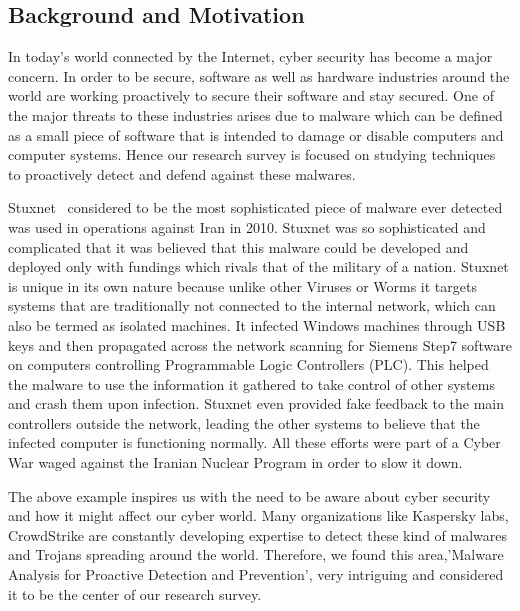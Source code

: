 \documentclass[11pt]{article}
\begin{document}
	\subsection{Background and Motivation}
	In today’s world connected by the Internet, cyber security has become a major concern. In order
to be secure, software as well as hardware industries around the world are working proactively to
secure their software and stay secured. One of the major threats to these industries arises due to
malware which can be defined as a small piece of software that is intended to damage or disable
computers and computer systems. Hence our research survey is focused on studying techniques
to proactively detect and defend against these malwares.

Stuxnet~\cite{creators2013kill, stuxnet} considered to be the most sophisticated piece of malware ever detected was used in operations against Iran in 2010. Stuxnet was so sophisticated and complicated that it was believed that this malware could be developed and deployed only with fundings which rivals that of the military of a nation. Stuxnet is unique in its own nature because unlike other Viruses or Worms it targets systems that are traditionally not connected to the internal network, which can also be termed as isolated machines. It infected Windows machines through USB keys and then propagated across the network scanning for Siemens Step7 software on computers controlling Programmable Logic Controllers (PLC). This helped the malware to use the information it gathered to take control of other systems and crash them upon infection. Stuxnet even provided fake feedback to the main controllers outside the network, leading the other systems to believe that the infected computer is functioning normally. All these efforts were part of a Cyber War waged against the Iranian Nuclear Program in order to slow it down.

The above example inspires us with the need to be aware about cyber security and how it might affect our cyber world. Many organizations like Kaspersky labs, CrowdStrike are constantly developing expertise to detect these kind of malwares and Trojans spreading around the world. Therefore, we found this area,'Malware Analysis for Proactive Detection and Prevention', very intriguing and considered it to be the center of our research survey.
\end{document}
